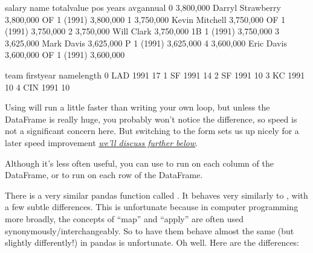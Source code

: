 \documentclass[letterpaper,10pt,english]{jupyterBook}
\begin{document}
\begin{sphinxVerbatim}[commandchars=\\\{\}]
\PYG{p}{[}\PYG{p}{]}  \PYG{p}{[}\PYG{p}{]}  
\end{sphinxVerbatim}

\begin{sphinxVerbatim}[commandchars=\\\{\}]
        salary               name  total\PYGZus{}value pos     years   avg\PYGZus{}annual  \PYGZbs{}
0  \PYGZdl{} 3,800,000  Darryl Strawberry  \PYGZdl{} 3,800,000  OF  1 (1991)  \PYGZdl{} 3,800,000   
1  \PYGZdl{} 3,750,000     Kevin Mitchell  \PYGZdl{} 3,750,000  OF  1 (1991)  \PYGZdl{} 3,750,000   
2  \PYGZdl{} 3,750,000         Will Clark  \PYGZdl{} 3,750,000  1B  1 (1991)  \PYGZdl{} 3,750,000   
3  \PYGZdl{} 3,625,000         Mark Davis  \PYGZdl{} 3,625,000   P  1 (1991)  \PYGZdl{} 3,625,000   
4  \PYGZdl{} 3,600,000         Eric Davis  \PYGZdl{} 3,600,000  OF  1 (1991)  \PYGZdl{} 3,600,000   

  team  first\PYGZus{}year  name\PYGZus{}length  
0  LAD        1991           17  
1   SF        1991           14  
2   SF        1991           10  
3   KC        1991           10  
4  CIN        1991           10  
\end{sphinxVerbatim}

\sphinxAtStartPar
Using  will run a little faster than writing your own loop, but unless the DataFrame is really huge, you probably won’t notice the difference, so speed is not a significant concern here.  But switching to the  form sets us up nicely for a later speed improvement {\hyperref[\detokenize{chapter-11-processing-rows:parallel-apply}]{\emph{we’ll discuss further below}}}.

\sphinxAtStartPar
Although it’s less often useful, you can use  to run  on each column of the DataFrame, or  to run  on each row of the DataFrame.

\sphinxAtStartPar
There is a very similar pandas function called .  It behaves very similarly to , with a few subtle differences.  This is unfortunate because in computer programming more broadly, the concepts of “map” and “apply” are often used synonymously/interchangeably.  So to have them behave almost the same (but slightly differently!) in pandas is unfortunate.  Oh well.  Here are the differences:
\end{document}
